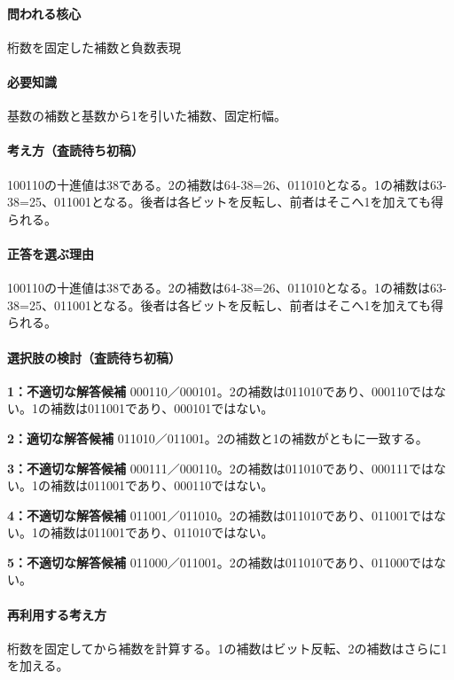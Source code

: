 \paragraph{問われる核心} 桁数を固定した補数と負数表現

\paragraph{必要知識} 基数の補数と基数から1を引いた補数、固定桁幅。

\paragraph{考え方（査読待ち初稿）} 100110の十進値は38である。2の補数は64-38=26、011010となる。1の補数は63-38=25、011001となる。後者は各ビットを反転し、前者はそこへ1を加えても得られる。

\paragraph{正答を選ぶ理由} 100110の十進値は38である。2の補数は64-38=26、011010となる。1の補数は63-38=25、011001となる。後者は各ビットを反転し、前者はそこへ1を加えても得られる。

\paragraph{選択肢の検討（査読待ち初稿）}

\noindent\textbf{1：不適切な解答候補} 000110／000101。2の補数は011010であり、000110ではない。1の補数は011001であり、000101ではない。\par

\noindent\textbf{2：適切な解答候補} 011010／011001。2の補数と1の補数がともに一致する。\par

\noindent\textbf{3：不適切な解答候補} 000111／000110。2の補数は011010であり、000111ではない。1の補数は011001であり、000110ではない。\par

\noindent\textbf{4：不適切な解答候補} 011001／011010。2の補数は011010であり、011001ではない。1の補数は011001であり、011010ではない。\par

\noindent\textbf{5：不適切な解答候補} 011000／011001。2の補数は011010であり、011000ではない。\par

\paragraph{再利用する考え方} 桁数を固定してから補数を計算する。1の補数はビット反転、2の補数はさらに1を加える。

